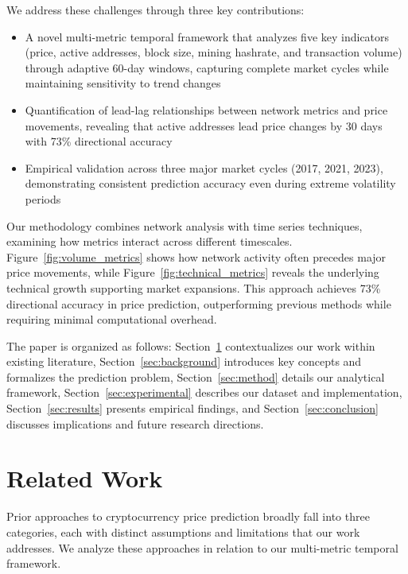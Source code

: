 \documentclass{article} %
\begin{document}
We address these challenges through three key contributions:

\begin{itemize}
    \item A novel multi-metric temporal framework that analyzes five key indicators (price, active addresses, block size, mining hashrate, and transaction volume) through adaptive 60-day windows, capturing complete market cycles while maintaining sensitivity to trend changes
    \item Quantification of lead-lag relationships between network metrics and price movements, revealing that active addresses lead price changes by 30 days with 73\% directional accuracy
    \item Empirical validation across three major market cycles (2017, 2021, 2023), demonstrating consistent prediction accuracy even during extreme volatility periods
\end{itemize}

Our methodology combines network analysis with time series techniques, examining how metrics interact across different timescales. Figure~\ref{fig:volume_metrics} shows how network activity often precedes major price movements, while Figure~\ref{fig:technical_metrics} reveals the underlying technical growth supporting market expansions. This approach achieves 73\% directional accuracy in price prediction, outperforming previous methods while requiring minimal computational overhead.

The paper is organized as follows: Section~\ref{sec:related} contextualizes our work within existing literature, Section~\ref{sec:background} introduces key concepts and formalizes the prediction problem, Section~\ref{sec:method} details our analytical framework, Section~\ref{sec:experimental} describes our dataset and implementation, Section~\ref{sec:results} presents empirical findings, and Section~\ref{sec:conclusion} discusses implications and future research directions.

\section{Related Work}
\label{sec:related}

Prior approaches to cryptocurrency price prediction broadly fall into three categories, each with distinct assumptions and limitations that our work addresses. We analyze these approaches in relation to our multi-metric temporal framework.
\end{document}
